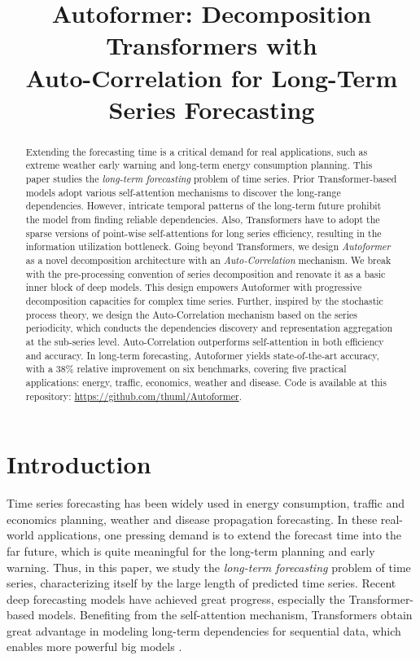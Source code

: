 \title{Autoformer: Decomposition Transformers with \\ Auto-Correlation
for Long-Term Series Forecasting}



\maketitle

\begin{abstract}
Extending the forecasting time is a critical demand for real applications, such as extreme weather early warning and long-term energy consumption planning. This paper studies the \textit{long-term forecasting} problem of time series. Prior Transformer-based models adopt various self-attention mechanisms to discover the long-range dependencies. However, intricate temporal patterns of the long-term future prohibit the model from finding reliable dependencies. Also, Transformers have to adopt the sparse versions of point-wise self-attentions for long series efficiency, resulting in the information utilization bottleneck. Going beyond Transformers, we design \textit{Autoformer} as a novel decomposition architecture with an \textit{Auto-Correlation} mechanism. We break with the pre-processing convention of series decomposition and renovate it as a basic inner block of deep models. This design empowers Autoformer with progressive decomposition capacities for complex time series. Further, inspired by the stochastic process theory, we design the Auto-Correlation mechanism based on the series periodicity, which conducts the dependencies discovery and representation aggregation at the sub-series level. Auto-Correlation outperforms self-attention in both efficiency and accuracy. In long-term forecasting, Autoformer yields state-of-the-art accuracy, with a 38\% relative improvement on six benchmarks, covering five practical applications: energy, traffic, economics, weather and disease. Code is available at this repository: \url{https://github.com/thuml/Autoformer}.
\end{abstract}

\section{Introduction}

Time series forecasting has been widely used in energy consumption, traffic and economics planning, weather and disease propagation forecasting. In these real-world applications, one pressing demand is to extend the forecast time into the far future, which is quite meaningful for the long-term planning and early warning.
Thus, in this paper, we study the \textit{long-term forecasting} problem of time series, characterizing itself by the large length of predicted time series.
Recent deep forecasting models \cite{haoyietal-informer-2021,kitaev2020reformer,2019Enhancing,Flunkert2017DeepARPF,oreshkin2019n,Sen2019ThinkGA,2018Modeling,NIPS2017_3f5ee243} have achieved great progress, especially the Transformer-based models. Benefiting from the self-attention mechanism, Transformers obtain great advantage in modeling long-term dependencies for sequential data, which enables more powerful big models \cite{NEURIPS2020_1457c0d6,Devlin2019BERTPO}.

